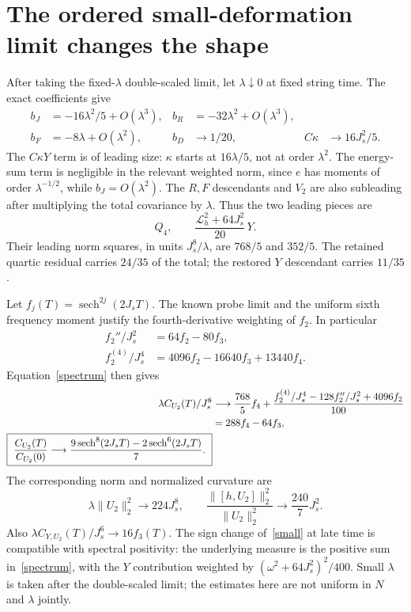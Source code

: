 \documentclass[11pt,a4paper]{article}
\newcommand{\J}{J_s}
\newcommand{\Lh}{\mathcal L_h}
\DeclareMathOperator{\sech}{sech}
\begin{document}
\newpage
\section{The ordered small-deformation limit changes the shape}
After taking the fixed-$\lambda$ double-scaled limit, let
$\lambda\downarrow0$ at fixed string time. The exact coefficients give
\begin{align}
 b_J&=-16\lambda^2/5+O(\lambda^3),&
 b_R&=-32\lambda^2+O(\lambda^3),\\
 b_F&=-8\lambda+O(\lambda^2),&
 b_D&\longrightarrow1/20,& C\kappa&\longrightarrow16\J^2/5.
\end{align}
The $C\kappa Y$ term is of leading size: $\kappa$ starts at
$16\lambda/5$, not at order $\lambda^2$.
The energy-sum term is negligible in the relevant weighted norm,
since $e$ has moments of order $\lambda^{-1/2}$, while $b_J=O(\lambda^2)$.
The $R,F$ descendants and $V_2$ are also subleading after multiplying
the total covariance by $\lambda$. Thus the two leading pieces are
\begin{equation}
 Q_4,\qquad \frac{\Lh^2+64\J^2}{20}\,Y.
\end{equation}
Their leading norm squares, in units $\J^8/\lambda$, are
$768/5$ and $352/5$. The retained quartic residual carries $24/35$
of the total; the restored $Y$ descendant carries $11/35$.

Let $f_j(T)=\sech^{2j}(2\J T)$. The known probe limit and the
uniform sixth frequency moment justify the fourth-derivative
weighting of $f_2$. In particular
\begin{align}
 f_2''/\J^2&=64f_2-80f_3,\\
 f_2^{(4)}/\J^4&=4096f_2-16640f_3+13440f_4.
\end{align}
Equation~\eqref{spectrum} then gives
\begin{align}
 \lambda C_{U_2}(T)/\J^8
 &\longrightarrow\frac{768}{5}f_4+
 \frac{f_2^{(4)}/\J^4-128f_2''/\J^2+4096f_2}{100}\notag\\
 &=288f_4-64f_3,\\
 \boxed{\ \frac{C_{U_2}(T)}{C_{U_2}(0)}
 \longrightarrow\frac{9\sech^8(2\J T)-2\sech^6(2\J T)}7.\ }\label{small}
\end{align}
The corresponding norm and normalized curvature are
\begin{equation}
 \lambda\|U_2\|_2^2\longrightarrow224\J^8,\qquad
 \frac{\|[h,U_2]\|_2^2}{\|U_2\|_2^2}
 \longrightarrow\frac{240}{7}\J^2.
\end{equation}
Also $\lambda C_{Y,U_2}(T)/\J^6\to16f_3(T)$.
The sign change of~\eqref{small} at late time is compatible with
spectral positivity: the underlying measure is the positive sum
in~\eqref{spectrum}, with the $Y$ contribution weighted by
$(\omega^2+64\J^2)^2/400$. Small $\lambda$ is taken after the
double-scaled limit; the estimates here are not uniform in $N$ and $\lambda$
jointly.
\end{document}
